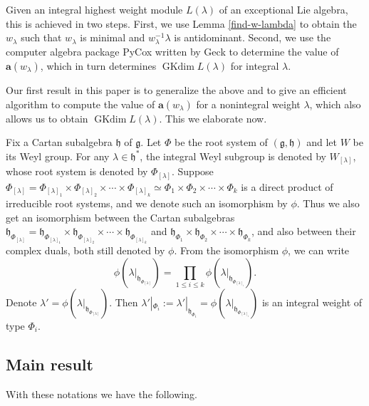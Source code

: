 \documentclass[reqno,12pt]{amsart}
\numberwithin{equation}{section}
\theoremstyle{plain}
\theoremstyle{definition}
\newcommand{\lam}{\lambda}
\newcommand{\aff}{ \mathbf{a} }
\newcommand{\gkd}{\operatorname{GKdim}}
\newcommand{\lest}{\leqslant}
\begin{document}
Given an integral  highest weight module $L(\lambda)$ of an exceptional Lie algebra, this is achieved in two steps. First, we use Lemma \ref{find-w-lambda} to obtain the $w_{\lam}$ such that $w_{\lam}$ is minimal and $w_{\lam}^{-1}\lambda$ is antidominant. Second, we use  the computer algebra package PyCox written by Geck \cite{ge} to determine the
value of $\aff(w_\lambda)$, which in turn determines $\gkd L(\lambda)$ for integral $\lambda$.

Our first result in this paper is to generalize the above and to give an efficient algorithm to compute the value of $\aff(w_{\lam})$ for a nonintegral weight $\lam$, which also allows us to obtain $\gkd L(\lambda)$. This we elaborate now.

Fix a Cartan subalgebra $\mathfrak{h}$ of $\mathfrak{g}$. Let $\Phi$ be the root system of $(\mathfrak{g},\mathfrak{h})$ and let $W$ be its Weyl group. For any $\lam\in \mathfrak{h}^*$, the integral Weyl subgroup is denoted by $W_{[\lam]}$, whose root system is denoted by $\Phi_{[\lambda]}$. Suppose  $\Phi_{[\lambda]}=\Phi_{[\lambda]_1}\times \Phi_{[\lambda]_2}\times \cdots \times \Phi_{[\lambda]_k}\simeq \Phi_1\times \Phi_2\times \cdots\times \Phi_k$  is a direct product of irreducible root systems, and we denote such an isomorphism by $\phi$.  Thus we also get an isomorphism between the Cartan subalgebras $\mathfrak{h}_{\Phi_{[\lambda]}}=\mathfrak{h}_{\Phi_{[\lambda]_1}}\times \mathfrak{h}_{\Phi_{[\lambda]_2}}\times \cdots \times \mathfrak{h}_{\Phi_{[\lambda]_k}}$ and $\mathfrak{h}_{\Phi_1}\times \mathfrak{h}_{\Phi_2}\times \cdots\times \mathfrak{h}_{\Phi_k}$, and also between their complex duals, both still denoted by $\phi$.
From the isomorphism  $\phi$, we can write 
$$\phi(\lam|_{\mathfrak{h}_{\Phi_{[\lam]}}})=\prod\limits_{1\lest i\lest k} \phi(\lambda|_{\mathfrak{h}_{\Phi_{[\lambda]_i}}}).$$
 Denote ${\lam}'=\phi(\lam|_{\mathfrak{h}_{\Phi_{[\lam]}}})$.
Then ${\lam}'|_{\Phi_i}:={\lam}'|_{{\mathfrak{h}_{\Phi_{i}}}}=\phi(\lambda|_{\mathfrak{h}_{\Phi_{[\lambda]_i}}})$ is an integral weight of type $\Phi_i$.

\subsection{Main result} With these notations we have the following.
\end{document}

